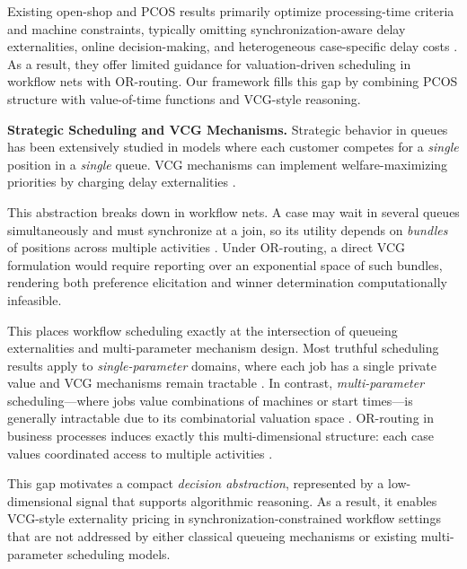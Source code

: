 \documentclass[letterpaper]{article}
\begin{document}
Existing open-shop and PCOS results primarily optimize processing-time
criteria and machine constraints, typically omitting synchronization-aware
delay externalities, online decision-making, and heterogeneous
case-specific delay costs \citep{graham1979optimization,grinshpoun2017pcos}.
As a result, they offer limited guidance for valuation-driven scheduling
in workflow nets with OR-routing. Our framework fills this gap by
combining PCOS structure with value-of-time functions and VCG-style
reasoning.



\noindent\textbf{Strategic Scheduling and VCG Mechanisms.} Strategic behavior in queues has been extensively studied in models
where each customer competes for a \emph{single} position in a
\emph{single} queue. VCG mechanisms
can implement welfare-maximizing priorities by charging delay
externalities \citep{lui1985bribery,hassin2003queue,nisan2007agt}.

This abstraction breaks down in workflow nets. A case may wait in
several queues simultaneously and must synchronize at a join, so its
utility depends on \emph{bundles} of positions across multiple
activities \citep{graham1979optimization}. Under OR-routing, a direct
VCG formulation would require reporting over an
exponential space of such bundles, rendering both preference elicitation
and winner determination computationally infeasible.

This places workflow scheduling exactly at the intersection of queueing
externalities and multi-parameter mechanism design. Most truthful scheduling results apply to \emph{single-parameter}
domains, where each job has a single private value and VCG mechanisms
remain tractable \citep{archer2001truthful,heydenreich2009games}. In contrast, \emph{multi-parameter} scheduling—where jobs value
combinations of machines or start times—is generally intractable due to
its combinatorial valuation space
\citep{dobzinski2008truthful,conitzer2006computational}. OR-routing in
business processes induces exactly this multi-dimensional structure:
each case values coordinated access to multiple activities
\citep{sandholm2002algorithm}.

This gap motivates a compact \emph{decision abstraction},  represented by a
low-dimensional signal that supports algorithmic reasoning.
As a result, it enables VCG-style externality pricing in synchronization-constrained
workflow settings that are not addressed by either classical queueing
mechanisms or existing multi-parameter scheduling models.
\end{document}
